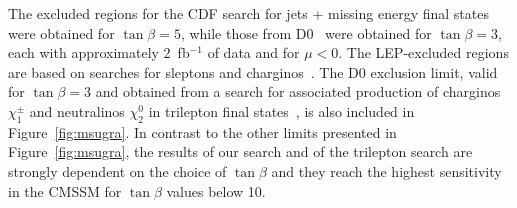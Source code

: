 The excluded regions  for the CDF
search for  jets + missing  energy final states~\cite{PhysRevLett.102.121801} were
obtained for $\tan\beta=5$, while those from D0~\cite{Abazov2008449} were obtained for 
$\tan\beta=3$, each with  approximately  2~fb$^{-1}$ of  data and for $\mu < 0$. 
The  LEP-excluded
regions  are based  on searches  for  sleptons and  charginos~\cite{LEPSUSY}.  
The D0 exclusion limit, valid for $\tan\beta=3$  and obtained from
a  search  for  associated  production   of  charginos $\chi_{1}^{\pm}$ and
neutralinos $\chi_2^0$ in  trilepton final states~\cite{Abazov200934}, is also
included  in Figure~\ref{fig:msugra}. In  contrast to  the other  limits  presented in
Figure~\ref{fig:msugra},  the results of our search and of the  trilepton search are  strongly dependent on
the choice  of $\tan\beta$ and  they reach the  highest sensitivity  in the
CMSSM for $\tan\beta$ values below 10.



